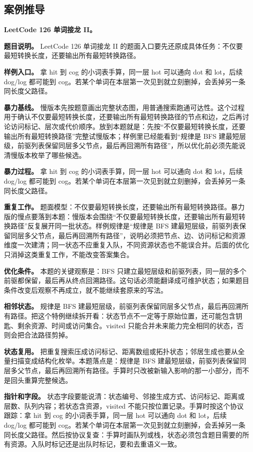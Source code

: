 \subsection{案例推导}

\noindent\textbf{LeetCode 126 单词接龙 II。}

\textbf{题目说明。} LeetCode 126 单词接龙 II 的题面入口要先还原成具体任务：不仅要最短转换长度，还要输出所有最短转换路径。

\textbf{样例入口。} 拿 hit 到 cog 的小词表手算，同一层 hot 可以通向 dot 和 lot，后续 dog/log 都可能到 cog。若某个单词在本层第一次见到就立刻删掉，会丢掉另一条同长度父路径。

\textbf{暴力基线。} 慢版本先按题意画出完整状态图，用普通搜索跑通可达性。这个过程用于确认不仅要最短转换长度，还要输出所有最短转换路径的节点和边，之后再讨论访问标记、层次或代价顺序。放到本题就是：先按“不仅要最短转换长度，还要输出所有最短转换路径”完整试慢版本；样例里已经能看到“规律是 BFS 建最短层级，前驱列表保留同层多父节点，最后再回溯所有路径”，所以优化前必须先能说清慢版本枚举了哪些候选。

\textbf{暴力过程。} 拿 hit 到 cog 的小词表手算，同一层 hot 可以通向 dot 和 lot，后续 dog/log 都可能到 cog。若某个单词在本层第一次见到就立刻删掉，会丢掉另一条同长度父路径。

\textbf{重复工作。} 题面模型：不仅要最短转换长度，还要输出所有最短转换路径。暴力版的慢点要落到本题：慢版本会围绕“不仅要最短转换长度，还要输出所有最短转换路径”反复展开同一批状态。样例规律是“规律是 BFS 建最短层级，前驱列表保留同层多父节点，最后再回溯所有路径”，说明必须把节点、边、访问标记和资源维度一次建清；同一状态不应重复入队，不同资源状态也不能误合并。后面的优化只消掉这类重复工作，不能改变答案集合。

\textbf{优化条件。} 本题的关键观察是：BFS 只建立最短层级和前驱列表，同一层的多个前驱都保留，最后再从终点回溯路径。这句话必须能翻译成可维护状态；如果题目条件改变后观察不再成立，就不能继续套原来的写法。

\textbf{相邻状态。} 规律是 BFS 建最短层级，前驱列表保留同层多父节点，最后再回溯所有路径。把这个特例继续拆开看：状态节点不一定等于原始位置，还可能包含钥匙、剩余资源、时间或访问集合。visited 只能合并未来能力完全相同的状态，否则会把合法路径剪掉。

\textbf{状态复用。} 把重复搜索压成访问标记、距离数组或拓扑状态；邻居生成也要从全量扫描变成结构化枚举。本题落点是：规律是 BFS 建最短层级，前驱列表保留同层多父节点，最后再回溯所有路径。手算时只改被新输入影响的那一小部分，而不是回头重算完整候选。

\textbf{指针和字段。} 状态字段要能说清：状态编号、邻接生成方式、访问标记、距离或层数、队列内容；若状态含资源，visited 不能只按位置记录。手算时按这个协议跟踪：拿 hit 到 cog 的小词表手算，同一层 hot 可以通向 dot 和 lot，后续 dog/log 都可能到 cog。若某个单词在本层第一次见到就立刻删掉，会丢掉另一条同长度父路径。然后按协议复查：手算时画队列或栈，状态必须包含题目需要的所有资源。入队时标记还是出队时标记，要和去重语义一致。


